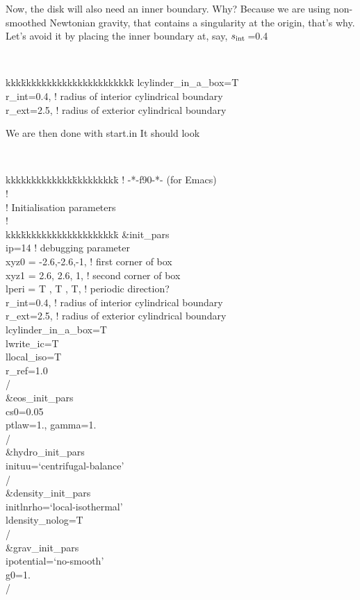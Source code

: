 \documentclass[a4paper,10pt]{article}
\newcommand{\rint}{$s_{\rm int}\,$}
\begin{document}
Now, the disk will also need an inner boundary. Why? Because we are using non-smoothed Newtonian gravity, that contains a singularity at the origin, that's why. Let's avoid it by placing the inner boundary at, say, \rint=0.4

{\tt 
\begin{tabbing}
  kkk\=kkkkkkkkkkkkkkkkkkkkkk\=\kill
  \>lcylinder\_in\_a\_box=T\\
  \>r\_int=0.4,\>                   ! radius of interior cylindrical boundary\\
  \>r\_ext=2.5,\>                   ! radius of exterior cylindrical boundary
\end{tabbing}
}



We are then done with start.in It should look

{\tt 
\begin{tabbing}
  kkkkkkkkkkkkk\=kkkkkkkkk\=\kill
! \>                          -*-f90-*-  \>   (for Emacs)\\
!\\
!  Initialisation parameters\\
!\\
kkk\=kkkkkkkkkkkkkkkkkkk\=\kill
\&init\_pars\\
  \>ip=14 \>                       ! debugging parameter\\
  \>xyz0  = -2.6,-2.6,-1,\>     ! first corner of box\\
  \>xyz1  =  2.6, 2.6, 1,\>     ! second corner of box\\
  \>lperi = T  , T  , T,    \>     ! periodic direction?\\
  \>r\_int=0.4,             \>      ! radius of interior cylindrical boundary\\
  \>r\_ext=2.5,             \>      ! radius of exterior cylindrical boundary\\
  \>lcylinder\_in\_a\_box=T\\
  \>lwrite\_ic=T\\
  \>llocal\_iso=T\\
  \>r\_ref=1.0\\
/\\
\&eos\_init\_pars\\
  \>cs0=0.05\\
  \>ptlaw=1., gamma=1.\\
/\\
\&hydro\_init\_pars\\
  \>inituu=`centrifugal-balance'\\
/\\
\&density\_init\_pars\\
  \>initlnrho=`local-isothermal'\\
  \>ldensity\_nolog=T\\
/\\
\&grav\_init\_pars\\
  \>ipotential=`no-smooth'\\
  \>g0=1.\\
/
\end{tabbing}
}
\end{document}
